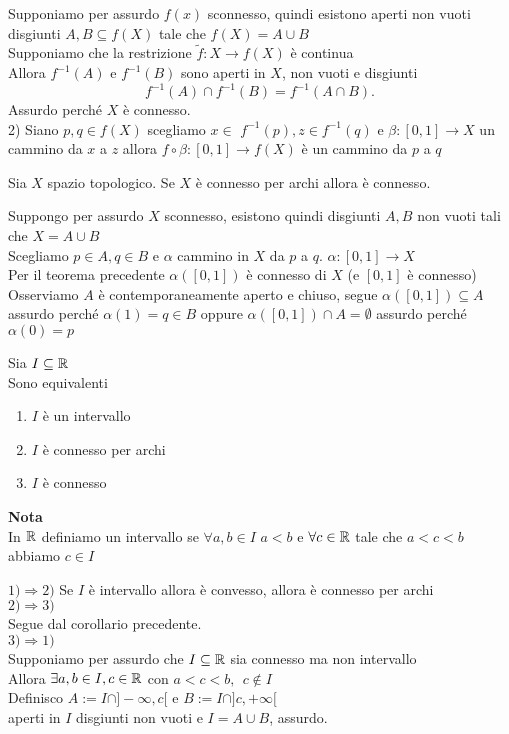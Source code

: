 \documentclass[12px]{article}
\begin{document}
 \begin{dimo}
 	Supponiamo per assurdo $f(x)$ sconnesso, quindi esistono aperti non vuoti disgiunti $A,B\subseteq f(X)$ tale che $f(X) = A\cup B$\\
	Supponiamo che la restrizione  $\tilde f : X \rightarrow f(X)$ è continua\\
	Allora $f^{-1}(A)$ e  $f^{-1}(B)$ sono aperti in  $X$, non vuoti e disgiunti 
	\[
	 f^{-1}(A)\cap f^{-1}(B) = f^{-1}(A\cap B)
	.\] 
	Assurdo perché $X$ è connesso.\\
	2) %
	Siano $p,q\in f(X)$ scegliamo  $x\in$ $f^{-1}(p), z \in f^{-1}(q)$ e $\beta : [0,1] \rightarrow X$ un cammino da $x$ a $z$ allora $f\circ \beta : [0,1] \rightarrow f(X)$ è un cammino da $p$ a $q$
 \end{dimo}
 \begin{coro}
 	Sia $X$ spazio topologico. Se $X$ è connesso per archi allora è connesso.
 \end{coro}
 \begin{dimo}
 	Suppongo per assurdo $X$ sconnesso, esistono quindi disgiunti $A,B$ non vuoti tali che $X = A\cup B$\\
	Scegliamo  $p\in A, q\in B$ e  $\alpha$ cammino in $X$ da  $p$ a $q$.  $\alpha :[0,1] \rightarrow X$ \\
	Per il teorema precedente $\alpha([0,1])$ è connesso di  $X$ (e  $[0,1]$ è connesso)\\
	Osserviamo $A$ è contemporaneamente aperto e chiuso, segue $\alpha([0,1])\subseteq A$ assurdo perché  $\alpha(1) = q\in B$ oppure  $\alpha([0,1])\cap A = \emptyset$ assurdo perché  $\alpha(0) = p$
 \end{dimo}
 \newpage
 \begin{prop}
 	Sia $I\subseteq \mathbb{R}$\\
	Sono equivalenti 
	 \begin{enumerate}
		 \item $I$ è un intervallo 
		 \item $I$ è connesso per archi
		 \item $I$ è connesso
	\end{enumerate}
 \end{prop}
 \textbf{Nota}\\
 In $\mathbb{R}$ definiamo un intervallo se $\forall a,b\in I$  $a < b$ e  $\forall c\in \mathbb{R} $ tale che $a < c < b$ abbiamo  $c\in I$ 
 \begin{dimo}
 	$1) \Rightarrow  2)$ 
	Se $I$ è intervallo allora è convesso, allora è connesso per archi\\
	$2) \Rightarrow  3)$ \\
	Segue dal corollario precedente.\\
	$ 3) \Rightarrow  1)$ \\
	Supponiamo per assurdo che $I\subseteq\mathbb{R} $ sia connesso ma non intervallo\\
	Allora  $\exists a,b\in I, c\in \mathbb{R}$ con $a<c<b, \ \ c\not\in I$\\
	Definisco $A := I\cap ]-\infty, c[$ e  $B:= I\cap ]c, +\infty [$\\
	aperti in  $I$ disgiunti non vuoti e  $I = A\cup B$, assurdo.
 \end{dimo}
\end{document}
